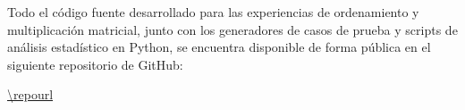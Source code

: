 Todo el código fuente desarrollado para las experiencias de ordenamiento y multiplicación matricial, junto con los generadores de casos de prueba y scripts de análisis estadístico en Python, se encuentra disponible de forma pública en el siguiente repositorio de GitHub:

\begin{center}
    \url{\repourl}
\end{center}